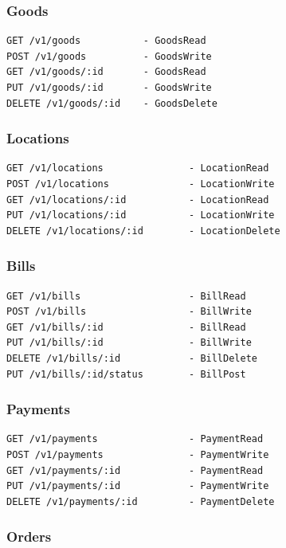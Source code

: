 \subsubsection{Goods}\label{goods}

\begin{verbatim}
GET /v1/goods           - GoodsRead
POST /v1/goods          - GoodsWrite
GET /v1/goods/:id       - GoodsRead
PUT /v1/goods/:id       - GoodsWrite
DELETE /v1/goods/:id    - GoodsDelete
\end{verbatim}

\subsubsection{Locations}\label{locations}

\begin{verbatim}
GET /v1/locations               - LocationRead
POST /v1/locations              - LocationWrite
GET /v1/locations/:id           - LocationRead
PUT /v1/locations/:id           - LocationWrite
DELETE /v1/locations/:id        - LocationDelete
\end{verbatim}

\subsubsection{Bills}\label{bills}

\begin{verbatim}
GET /v1/bills                   - BillRead
POST /v1/bills                  - BillWrite
GET /v1/bills/:id               - BillRead
PUT /v1/bills/:id               - BillWrite
DELETE /v1/bills/:id            - BillDelete
PUT /v1/bills/:id/status        - BillPost
\end{verbatim}

\subsubsection{Payments}\label{payments}

\begin{verbatim}
GET /v1/payments                - PaymentRead
POST /v1/payments               - PaymentWrite
GET /v1/payments/:id            - PaymentRead
PUT /v1/payments/:id            - PaymentWrite
DELETE /v1/payments/:id         - PaymentDelete
\end{verbatim}

\subsubsection{Orders}\label{orders}

